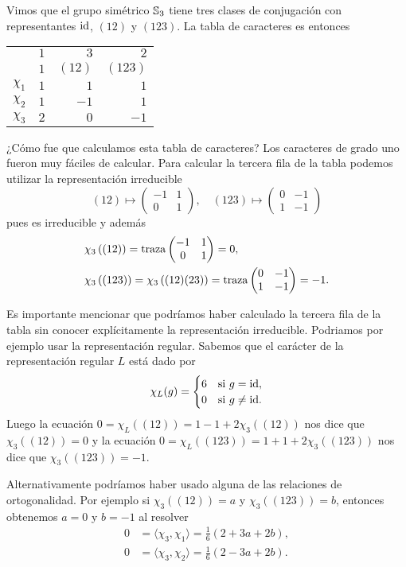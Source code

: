\begin{example}
	Vimos que el grupo simétrico $\mathbb{S}_3$ tiene tres clases de conjugación 
	con representantes $\operatorname{id}$, $(12)$ y $(123)$. La tabla de caracteres es entonces
	\begin{center}
		\begin{tabular}{|c|rrr|}
			\hline
			& $1$ & $3$ & $2$\tabularnewline
			& $1$ & $(12)$ & $(123)$ \tabularnewline
			\hline 
			$\chi_{1}$ & $1$ & $1$ & $1$\tabularnewline
			$\chi_{2}$ & $1$ & $-1$ & $1$ \tabularnewline
			$\chi_{3}$ & $2$ & $0$ & $-1$ \tabularnewline
			\hline
		\end{tabular}
	\end{center}
	¿Cómo fue que calculamos esta tabla de caracteres? Los caracteres de grado
	uno fueron muy fáciles de calcular. Para calcular la tercera fila de la
	tabla podemos utilizar la representación irreducible 
	\[
	(12)\mapsto \begin{pmatrix}-1&1\\0&1\end{pmatrix},
	\quad
	(123)\mapsto \begin{pmatrix}0&-1\\1&-1\end{pmatrix}
	\]
	pues es irreducible y además 
	\begin{align*}
		&\chi_3\left( (12) \right)=\operatorname{traza}\begin{pmatrix}-1&1\\0&1\end{pmatrix}=0,\\
		&\chi_3\left( (123) \right)=\chi_3\left( (12)(23)\right)=\operatorname{traza}\begin{pmatrix}0&-1\\1&-1\end{pmatrix}=-1.
	\end{align*}

	Es importante mencionar que podríamos haber calculado la tercera fila de la
	tabla sin conocer explícitamente la representación irreducible. Podriamos
	por ejemplo usar la representación regular.  
	Sabemos que el carácter de la representación
	regular $L$ está dado por
	\[
		\chi_L(g)=\begin{cases}
			6 & \text{si $g=\operatorname{id}$},\\
			0 & \text{si $g\ne\operatorname{id}$}.
		\end{cases}
	\]
	Luego la ecuación $0=\chi_L\left( (12) \right)=1-1+2\chi_3( (12))$ nos dice
	que $\chi_3( (12))=0$ y la ecuación $0=\chi_L( (123))=1+1+2\chi_3( (123))$
	nos dice que $\chi_3\left( (123) \right)=-1$. 

	Alternativamente podríamos haber usado alguna de las relaciones de
	ortogonalidad. Por ejemplo si $\chi_3( (12) )=a$ y $\chi_3( (123))=b$,
	entonces obtenemos $a=0$ y $b=-1$ al resolver 
	\begin{align*}
		0&=\langle \chi_3,\chi_1\rangle=\frac16(2+3a+2b),\\
		0&=\langle \chi_3,\chi_2\rangle=\frac16(2-3a+2b).
	\end{align*}
\end{example}

